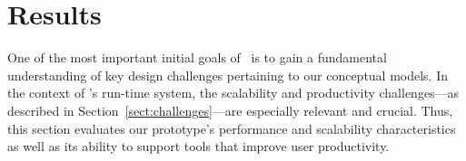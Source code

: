 \section{Results}
\label{sec:results}
One of the most important initial goals of \flux\ is to gain
a fundamental understanding of key design challenges pertaining
to our conceptual models.
In the context of \flux's run-time system, the scalability
and productivity
challenges---as described in Section~\ref{sect:challenges}---are especially
relevant and crucial. 
Thus, this section evaluates our prototype's performance
and scalability characteristics as well as its ability
to support tools that improve user productivity.




